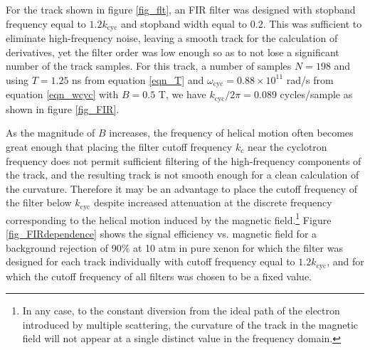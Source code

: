 \documentclass{JINST}
\begin{document}
For the track shown in figure \ref{fig_flt}, an FIR filter was designed with 
stopband frequency equal to $1.2k_{\mathrm{cyc}}$ and stopband width equal to 0.2.  This was sufficient to 
eliminate high-frequency noise, leaving a smooth track for the calculation of derivatives, yet the filter order was
low enough so as to not lose a significant number of the track samples.  For this track, a number of samples 
$N = 198$ and using $T = 1.25$ ns from equation \ref{eqn_T} and $\omega_{\mathrm{cyc}} = 0.88 \times 
10^{11}$ rad/s from equation \ref{eqn_wcyc} with $B = 0.5$ T, we have $k_{\mathrm{cyc}}/2\pi = 0.089$ 
cycles/sample as shown in figure \ref{fig_FIR}.

As the magnitude of $B$ increases, the frequency of helical motion often becomes great enough that placing the 
filter cutoff frequency $k_{c}$ near the cyclotron frequency does not permit sufficient filtering of the 
high-frequency components of the track, and the resulting track is not smooth enough for a clean calculation of 
the curvature.  Therefore it may be an advantage to place the cutoff frequency of the filter below 
$k_{\mathrm{cyc}}$ despite increased attenuation at the discrete frequency corresponding to the helical motion 
induced by the magnetic field.\footnote{In any case, to the constant diversion from the ideal path of the electron
introduced by multiple scattering, the curvature of the track in the magnetic field will not appear at a single 
distinct value in the frequency domain.}  Figure \ref{fig_FIRdependence} shows the signal efficiency vs. magnetic
field for a background rejection of 90\% at 10 atm in pure xenon for which the filter was designed for each track 
individually with cutoff frequency equal to $1.2k_{\mathrm{cyc}}$, and for which the cutoff frequency of all filters 
was chosen to be a fixed value.
\end{document}
